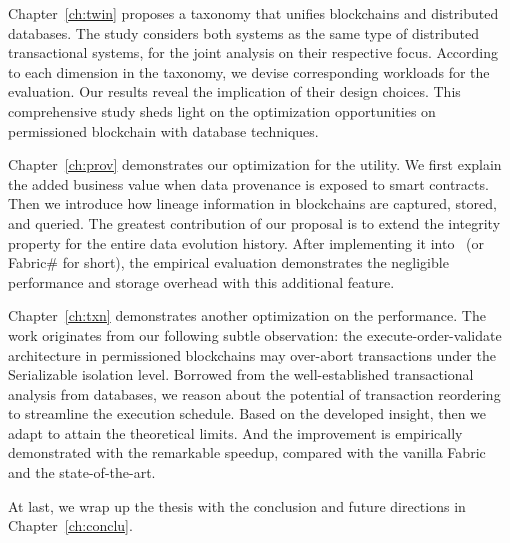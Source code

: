 Chapter~\ref{ch:twin} proposes a taxonomy that unifies blockchains and distributed databases. 
The study considers both systems as the same type of distributed transactional systems, for the joint analysis on their respective focus. 
According to each dimension in the taxonomy, we devise corresponding workloads for the evaluation. 
Our results reveal the implication of their design choices. 
This comprehensive study sheds light on the optimization opportunities on permissioned blockchain with database techniques. 

Chapter~\ref{ch:prov} demonstrates our optimization for the utility. 
We first explain the added business value when data provenance is exposed to smart contracts. 
Then we introduce how lineage information in blockchains are captured, stored, and queried. 
The greatest contribution of our proposal is to extend the integrity property for the entire data evolution history. 
After implementing it into {\fs}~(or Fabric\# for short), the empirical evaluation demonstrates the negligible performance and storage overhead with this additional feature. 

Chapter~\ref{ch:txn} demonstrates another optimization on the performance. 
The work originates from our following subtle observation:
the execute-order-validate architecture in permissioned blockchains may over-abort transactions under the Serializable isolation level. 
Borrowed from the well-established transactional analysis from databases, we reason about the potential of transaction reordering to streamline the execution schedule. Based on the developed insight, then we adapt {\fs} to attain the theoretical limits. 
And the improvement is empirically demonstrated with the remarkable speedup, compared with the vanilla Fabric and the state-of-the-art. 

At last, we wrap up the thesis with the conclusion and future directions in Chapter~\ref{ch:conclu}. 

